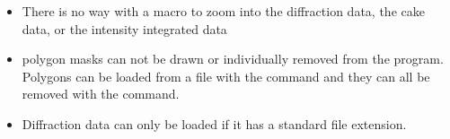 \begin{itemize}
    \item There is no way with a macro to zoom into the diffraction
    data, the cake data, or the intensity integrated data
    \item polygon masks can not be drawn or individually removed
    from the program. Polygons can be loaded from a file with the
     command and they can all be removed with the
     command.
    \item Diffraction data can only be loaded if it has a standard 
    file extension. 
\end{itemize}

